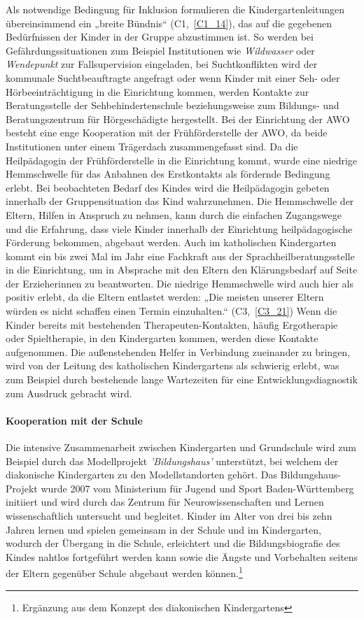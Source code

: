 Als notwendige Bedingung für Inklusion formulieren die Kindergartenleitungen übereinsimmend ein „breite Bündnis“ (C1,~\ref{C1_14}), das auf die gegebenen Bedürfnissen der Kinder in der Gruppe abzustimmen ist. So werden bei Gefährdungssituationen zum Beispiel Institutionen wie \emph{Wildwasser} oder \emph{Wendepunkt} zur Fallsupervision eingeladen, bei Suchtkonflikten wird der kommunale Suchtbeauftragte angefragt oder wenn Kinder mit einer Seh- oder Hörbeeinträchtigung in die Einrichtung kommen, werden Kontakte zur Beratungsstelle der Sehbehindertenschule beziehungsweise zum Bildungs- und Beratungszentrum für Hörgeschädigte hergestellt. Bei der Einrichtung der AWO besteht eine enge Kooperation mit der Frühförderstelle der AWO, da beide Institutionen unter einem Trägerdach zusammengefasst sind. Da die Heilpädagogin der Frühförderstelle in die Einrichtung kommt, wurde eine niedrige Hemmschwelle für das Anbahnen des Erstkontakts als fördernde Bedingung erlebt. Bei beobachteten  Bedarf des Kindes wird die Heilpädagogin gebeten innerhalb der Gruppensituation das Kind wahrzunehmen. Die Hemmschwelle der Eltern, Hilfen in Anspruch zu nehmen, kann durch die einfachen Zugangswege und die Erfahrung, dass viele Kinder innerhalb der Einrichtung heilpädagogische Förderung bekommen, abgebaut werden.
Auch im katholischen Kindergarten kommt ein bis zwei Mal im Jahr eine Fachkraft aus der Sprachheilberatungsstelle in die Einrichtung, um in Absprache mit den Eltern den Klärungsbedarf auf Seite der Erzieherinnen zu beantworten. Die niedrige Hemmschwelle wird auch hier als positiv erlebt, da die Eltern entlastet werden: „Die meisten unserer Eltern würden es nicht schaffen einen Termin einzuhalten.“ (C3,~\ref{C3_21}) 
Wenn die Kinder bereits mit bestehenden Therapeuten-Kontakten, häufig Ergotherapie oder Spieltherapie, in den Kindergarten kommen, werden diese Kontakte aufgenommen.     
Die außenstehenden Helfer in Verbindung zueinander zu bringen, wird von der Leitung des katholischen Kindergartens als schwierig erlebt, was zum Beispiel durch bestehende lange Wartezeiten für eine Entwicklungsdiagnostik zum Ausdruck gebracht wird. 
  
\paragraph{Kooperation mit der Schule}
Die intensive Zusammenarbeit zwischen Kindergarten und Grundschule wird zum Beispiel durch das Modellprojekt \emph{'Bildungshaus'} unterstützt, bei welchem der diakonische Kindergarten zu den Modellstandorten gehört. Das Bildungshaus-Projekt wurde 2007 vom Ministerium für Jugend und Sport Baden-Württemberg initiiert und wird durch das Zentrum für Neurowissenschaften und Lernen wissenschaftlich untersucht und begleitet. 
Kinder im Alter von drei bis zehn Jahren lernen und spielen gemeinsam in der Schule und im Kindergarten, wodurch der Übergang in die Schule, erleichtert und die Bildungsbiografie des Kindes nahtlos fortgeführt werden kann sowie die Ängste und Vorbehalten seitens der Eltern gegenüber Schule abgebaut werden können.\footnote{Ergänzung aus dem Konzept des diakonischen Kindergartens}

